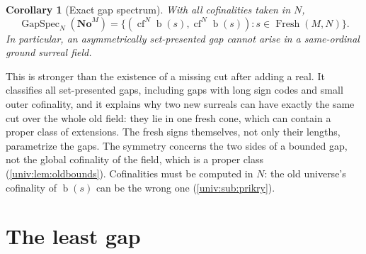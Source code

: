 \documentclass[11pt,letterpaper]{article}
\numberwithin{equation}{section}
\newtheorem{corollary}[corollary]{Corollary}
\theoremstyle{definition}
\theoremstyle{remark}
\newcommand{\No}{\mathbf{No}}
\newcommand{\NoM}{\No^{M}}
\newcommand{\bd}{\operatorname{b}}
\newcommand{\cf}{\operatorname{cf}}
\newcommand{\Fresh}{\operatorname{Fresh}}
\newcommand{\GapSpec}{\operatorname{GapSpec}}
\begin{document}
\begin{corollary}[Exact gap spectrum]\label{univ:cor:gapspectrum}
With all cofinalities taken in $N$,
\begin{equation}\label{univ:eq:gapspectrum}
 \GapSpec_N(\NoM)=
 \bigl\{(\cf^N\bd(s),\cf^N\bd(s)):
                s\in\Fresh(M,N)\bigr\}.
\end{equation}
In particular, an asymmetrically set-presented gap cannot arise in a
same-ordinal ground surreal field.
\end{corollary}

This is stronger than the existence of a missing cut after adding a real. It
classifies all set-presented gaps, including gaps with long sign codes and
small outer cofinality, and it explains why two new surreals can have exactly
the same cut over the whole old field: they lie in one fresh cone, which can
contain a proper class of extensions. The fresh signs themselves, not only
their lengths, parametrize the gaps. The symmetry concerns the two sides of a
bounded gap, not the global cofinality of the field, which is a proper class
(\cref{univ:lem:oldbounds}). Cofinalities must be computed in $N$: the old
universe's cofinality of $\bd(s)$ can be the wrong one (\cref{univ:sub:prikry}).

\section{The least gap}\label{univ:sec:leastgap}
\end{document}
